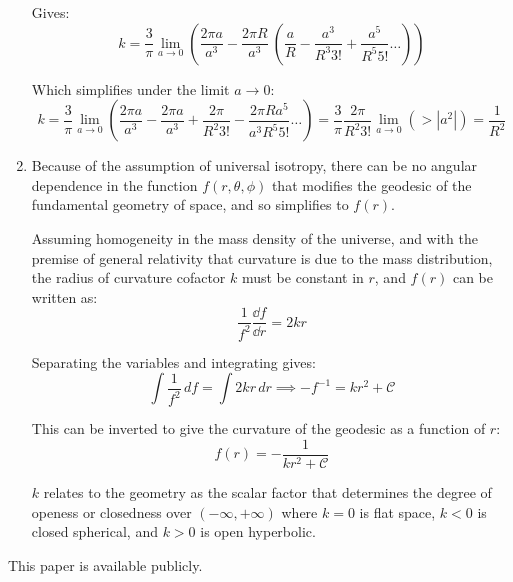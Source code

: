 \documentclass{paper}
\begin{document}
\begin{enumerate}
     Gives:
      \[ k = \frac{3}{\pi} \lim_{a \to 0} \left( \frac{2 \pi a}{a^3} - 
        \frac{2 \pi R}{a^3}\ \left( \frac{a}{R} - \frac{a^3}{R^3 3!} +
        \frac{a^5}{R^5 5!} \ldots \right) \right)\]

     Which simplifies under the limit \(a \to 0\):
      \[ k = \frac{3}{\pi} \lim_{a \to 0} \left( \frac{2 \pi a}{a^3} - 
        \frac{2 \pi a}{a^3} + \frac{2 \pi }{R^2 3!} - 
        \frac{2 \pi R a^5}{a^3 R^5 5!} \ldots \right) 
        = \frac{3}{\pi} \frac{2 \pi}{R^2 3!} \lim_{a \to 0}
        \left( > |a^2| \right) = \frac{1}{R^2} \]

   \item %
     Because of the assumption of universal isotropy, there can be no angular
     dependence in the function \(f{(r,\theta,\phi)}\) that modifies the 
     geodesic of the fundamental geometry of space, and so simplifies to 
     \(f{(r)}\).

     Assuming homogeneity in the mass density of the universe, and with the 
     premise of general relativity that curvature is due to the mass 
     distribution, the radius of curvature cofactor \(k\) must be constant 
     in \(r\), and \(f{(r)}\) can be written as:
     \[ \frac{1}{f^2} \frac{\dd{f}}{\dd{r}} = 2 k r \]

     Separating the variables and integrating gives:
     \[ \int \frac{1}{f^2} \,df = \int 2 k r \, dr  \implies 
       - f^{-1} = k r^2 + \mathcal{C} \]

     This can be inverted to give the curvature of the geodesic as a function
     of \(r\):
     \begin{equation}
       f{(r)} = - \frac{1}{k r^2 + \mathcal{C}}
       \label{eqn:f_r}
     \end{equation}

     \(k\) relates to the geometry as the scalar factor that determines the
     degree of openess or closedness over \(\left( -\infty ,+\infty \right)\)
     where \( k = 0 \) is flat space, \( k < 0 \) is closed spherical, and
     \( k > 0 \) is open hyperbolic.

\end{enumerate}

This paper is available publicly.\cite{Hayden_Cosmology_Source_Repo}

\pagebreak
\printbibliography
\end{document}
